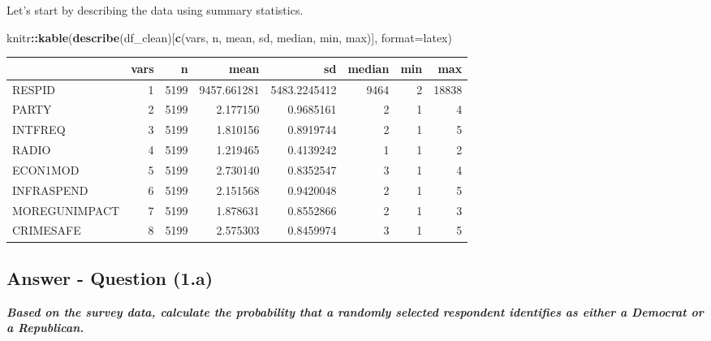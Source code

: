 \documentclass[
  11pt,
]{article}
\newenvironment{Shaded}{\begin{snugshade}}{\end{snugshade}}
\newcommand{\AttributeTok}[1]{\textcolor[rgb]{0.13,0.29,0.53}{#1}}
\newcommand{\FunctionTok}[1]{\textcolor[rgb]{0.13,0.29,0.53}{\textbf{#1}}}
\newcommand{\NormalTok}[1]{#1}
\newcommand{\SpecialCharTok}[1]{\textcolor[rgb]{0.81,0.36,0.00}{\textbf{#1}}}
\newcommand{\StringTok}[1]{\textcolor[rgb]{0.31,0.60,0.02}{#1}}
\begin{document}
Let's start by describing the data using summary statistics.

\begin{Shaded}
\begin{Highlighting}[]
\NormalTok{knitr}\SpecialCharTok{::}\FunctionTok{kable}\NormalTok{(}\FunctionTok{describe}\NormalTok{(df\_clean)[}\FunctionTok{c}\NormalTok{(}\StringTok{\textquotesingle{}vars\textquotesingle{}}\NormalTok{, }\StringTok{\textquotesingle{}n\textquotesingle{}}\NormalTok{, }\StringTok{\textquotesingle{}mean\textquotesingle{}}\NormalTok{, }\StringTok{\textquotesingle{}sd\textquotesingle{}}\NormalTok{, }\StringTok{\textquotesingle{}median\textquotesingle{}}\NormalTok{, }\StringTok{\textquotesingle{}min\textquotesingle{}}\NormalTok{, }\StringTok{\textquotesingle{}max\textquotesingle{}}\NormalTok{)], }\AttributeTok{format=}\StringTok{\textquotesingle{}latex\textquotesingle{}}\NormalTok{)}
\end{Highlighting}
\end{Shaded}

\begin{tabular}{l|r|r|r|r|r|r|r}
\hline
  & vars & n & mean & sd & median & min & max\\
\hline
RESPID & 1 & 5199 & 9457.661281 & 5483.2245412 & 9464 & 2 & 18838\\
\hline
PARTY & 2 & 5199 & 2.177150 & 0.9685161 & 2 & 1 & 4\\
\hline
INTFREQ & 3 & 5199 & 1.810156 & 0.8919744 & 2 & 1 & 5\\
\hline
RADIO & 4 & 5199 & 1.219465 & 0.4139242 & 1 & 1 & 2\\
\hline
ECON1MOD & 5 & 5199 & 2.730140 & 0.8352547 & 3 & 1 & 4\\
\hline
INFRASPEND & 6 & 5199 & 2.151568 & 0.9420048 & 2 & 1 & 5\\
\hline
MOREGUNIMPACT & 7 & 5199 & 1.878631 & 0.8552866 & 2 & 1 & 3\\
\hline
CRIMESAFE & 8 & 5199 & 2.575303 & 0.8459974 & 3 & 1 & 5\\
\hline
\end{tabular}

\subsection{Answer - Question (1.a)}\label{answer---question-1.a}

\textbf{\emph{Based on the survey data, calculate the probability that a
randomly selected respondent identifies as either a Democrat or a
Republican.}}
\end{document}
